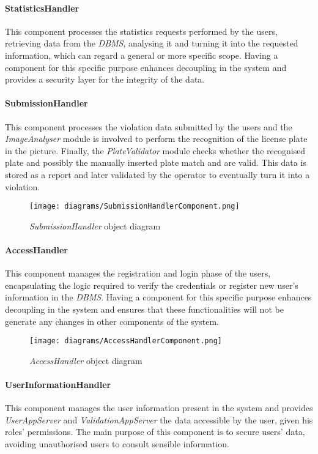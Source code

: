 \paragraph{StatisticsHandler}
This component processes the statistics requests performed by the users, retrieving data from the \textit{DBMS}, analysing it and turning it into the requested information, which can regard a general or more specific scope. Having a component for this specific purpose enhances decoupling in the system and provides a security layer for the integrity of the data.
\clearpage\paragraph{SubmissionHandler}
This component processes the violation data submitted by the users and the \textit{ImageAnalyser} module is involved to perform the recognition of the license plate in the picture. Finally, the \textit{PlateValidator} module checks whether the recognised plate and possibly the manually inserted plate match and are valid. This data is stored as a report and later validated by the operator to eventually turn it into a violation.\newline\newline
\begin{figure}[h!]
	\centering
	\texttt{[image: diagrams/SubmissionHandlerComponent.png]}
	\caption{
		\label{fig:submissionHandlerComponentDiagram} 
		\emph{SubmissionHandler} object diagram
	}
\end{figure}
\paragraph{AccessHandler}
This component manages the registration and login phase of the users, encapsulating the logic required to verify the credentials or register new user's information in the \textit{DBMS}. Having a component for this specific purpose enhances decoupling in the system and ensures that these functionalities will not be generate any changes in other components of the system.\newline\newline
\begin{figure}[h!]
	\centering
	\texttt{[image: diagrams/AccessHandlerComponent.png]}
	\caption{
		\label{fig:accessHandlerComponentDiagram} 
		\emph{AccessHandler} object diagram
	}
\end{figure}
\paragraph{UserInformationHandler}
This component manages the user information present in the system and provides \textit{UserAppServer} and \textit{ValidationAppServer} the data accessible by the user, given his roles' permissions. The main purpose of this component is to secure users' data, avoiding unauthorised users to consult sensible information. 
